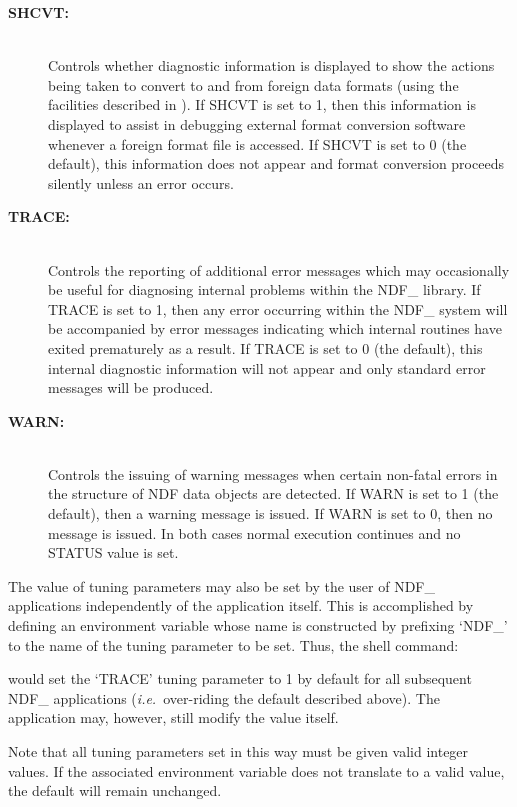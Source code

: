 \documentclass[twoside,11pt,nolof]{starlink}
\providecommand{\st}[1]{{\emph{#1}}}
\begin{document}
\begin{description}
\item[\textbf{SHCVT:}]\mbox{}\\
Controls whether diagnostic information is displayed to show the
actions being taken to convert to and from foreign data formats (using
the facilities described in ). If SHCVT is set
to 1, then this
information is displayed to assist in debugging external format
conversion software whenever a foreign format file is accessed. If
SHCVT is set to 0 (the default), this information does not appear and
format conversion proceeds silently unless an error occurs.

\item[\textbf{TRACE:}]\mbox{}\\
Controls the reporting of additional error messages which may
occasionally be useful for diagnosing internal problems within the
NDF\_ library. If TRACE is set to 1, then any error occurring within
the NDF\_ system will be accompanied by error messages indicating
which internal routines have exited prematurely as a result. If TRACE
is set to 0 (the default), this internal diagnostic information will
not appear and only standard error messages will be produced.

\item[\textbf{WARN:}]\mbox{}\\
Controls the issuing of warning messages when certain non-fatal errors
in the structure of NDF data objects are detected. If WARN is set to 1
(the default), then a warning message is issued. If WARN is set to 0,
then no message is issued.  In both cases normal execution continues
and no STATUS value is set.

\end{description}

The value of tuning parameters may also be set by the user of NDF\_
applications independently of the application itself. This is
accomplished by defining an environment variable whose name is
constructed by prefixing `NDF\_' to the name of the tuning parameter
to be set. Thus, the shell command:

\small
\begin{terminalv}
\end{terminalv}
\normalsize

would set the `TRACE' tuning parameter to 1 by default for all
subsequent NDF\_ applications (\st{i.e.}\ over-riding the default
described above). The application may, however, still modify the value
itself.

Note that all tuning parameters set in this way must be given valid
integer values. If the associated environment variable does not
translate to a valid value, the default will remain unchanged.
\end{document}

